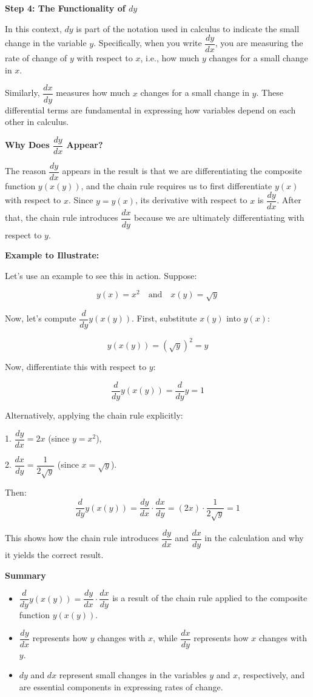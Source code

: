 \documentclass[a4paper,12pt]{book}
\begin{document}
\textbf{Step 4: The Functionality of \( dy \)}

In this context, \( dy \) is part of the notation used in calculus to indicate the small change in the variable \( y \). Specifically, when you write \( \dfrac{dy}{dx} \), you are measuring the rate of change of \( y \) with respect to \( x \), i.e., how much \( y \) changes for a small change in \( x \).

Similarly, \( \dfrac{dx}{dy} \) measures how much \( x \) changes for a small change in \( y \). These differential terms are fundamental in expressing how variables depend on each other in calculus.

\textbf{Why Does \( \dfrac{dy}{dx} \) Appear?}

The reason \( \dfrac{dy}{dx} \) appears in the result is that we are differentiating the composite function \( y(x(y)) \), and the chain rule requires us to first differentiate \( y(x) \) with respect to \( x \). Since \( y = y(x) \), its derivative with respect to \( x \) is \( \dfrac{dy}{dx} \). After that, the chain rule introduces \( \dfrac{dx}{dy} \) because we are ultimately differentiating with respect to \( y \).

\textbf{Example to Illustrate:}

Let’s use an example to see this in action. Suppose:

\[
y(x) = x^2 \quad \text{and} \quad x(y) = \sqrt{y}
\]

Now, let's compute \( \dfrac{d}{dy} y(x(y)) \). First, substitute \( x(y) \) into \( y(x) \):

\[
y(x(y)) = (\sqrt{y})^2 = y
\]

Now, differentiate this with respect to \( y \):

\[
\dfrac{d}{dy} y(x(y)) = \dfrac{d}{dy} y = 1
\]

Alternatively, applying the chain rule explicitly:

1. \( \dfrac{dy}{dx} = 2x \) (since \( y = x^2 \)),

2. \( \dfrac{dx}{dy} = \dfrac{1}{2\sqrt{y}} \) (since \( x = \sqrt{y} \)).

Then:
\[
\dfrac{d}{dy} y(x(y)) = \dfrac{dy}{dx} \cdot \dfrac{dx}{dy} = (2x) \cdot \dfrac{1}{2\sqrt{y}} = 1
\]

This shows how the chain rule introduces \( \dfrac{dy}{dx} \) and \( \dfrac{dx}{dy} \) in the calculation and why it yields the correct result.

\textbf{Summary}

\begin{itemize}
	\item 
	\( \dfrac{d}{dy} y(x(y)) = \dfrac{dy}{dx} \cdot \dfrac{dx}{dy} \) is a result of the chain rule applied to the composite function \( y(x(y)) \).
	\item 
	\( \dfrac{dy}{dx} \) represents how \( y \) changes with \( x \), while \( \dfrac{dx}{dy} \) represents how \( x \) changes with \( y \).
	\item
	\( dy \) and \( dx \) represent small changes in the variables \( y \) and \( x \), respectively, and are essential components in expressing rates of change.
\end{itemize}
	
\end{document}
